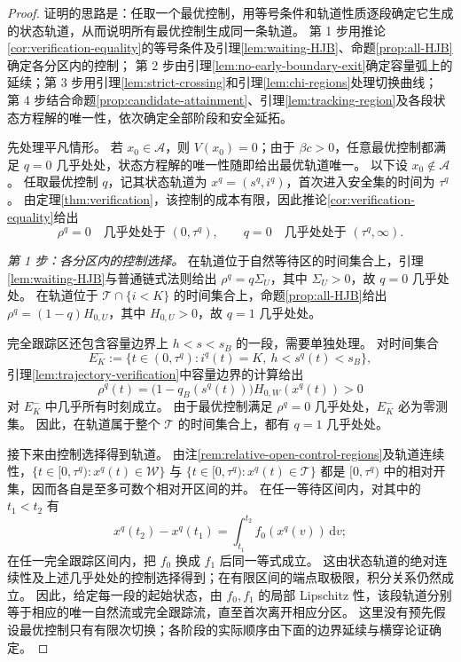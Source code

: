 \documentclass[11pt,a4paper,UTF8]{ctexart}
\theoremstyle{definition}
\newcommand{\Acal}{\mathcal A}
\newcommand{\dd}{\,\mathrm d}
\begin{document}
\begin{proof}
证明的思路是：任取一个最优控制，用等号条件和轨道性质逐段确定它生成的状态轨道，从而说明所有最优控制生成同一条轨道。
第 1 步用推论\ref{cor:verification-equality}的等号条件及引理\ref{lem:waiting-HJB}、命题\ref{prop:all-HJB}确定各分区内的控制；
第 2 步由引理\ref{lem:no-early-boundary-exit}确定容量弧上的延续；第 3 步用引理\ref{lem:strict-crossing}和引理\ref{lem:chi-regions}处理切换曲线；
第 4 步结合命题\ref{prop:candidate-attainment}、引理\ref{lem:tracking-region}及各段状态方程解的唯一性，依次确定全部阶段和安全延拓。

先处理平凡情形。
若 $x_0\in\Acal$，则 $V(x_0)=0$；由于 $\beta c>0$，任意最优控制都满足 $q=0$ 几乎处处，状态方程解的唯一性随即给出最优轨道唯一。
以下设 $x_0\notin\Acal$。
任取最优控制 $q$，记其状态轨道为 $x^q=(s^q,i^q)$，首次进入安全集的时间为 $\tau^q$。
由定理\ref{thm:verification}，该控制的成本有限，因此推论\ref{cor:verification-equality}给出
\[
\rho^q=0\quad\text{几乎处处于 }(0,\tau^q),\qquad
q=0\quad\text{几乎处处于 }(\tau^q,\infty).
\]

\emph{第 1 步：各分区内的控制选择。}
在轨道位于自然等待区的时间集合上，引理\ref{lem:waiting-HJB}与普通链式法则给出 $\rho^q=q\Sigma_U$，其中 $\Sigma_U>0$，故 $q=0$ 几乎处处。
在轨道位于 $\mathcal T\cap\{i<K\}$ 的时间集合上，命题\ref{prop:all-HJB}给出 $\rho^q=(1-q)H_{0,U}$，其中 $H_{0,U}>0$，故 $q=1$ 几乎处处。

完全跟踪区还包含容量边界上 $h<s<s_B$ 的一段，需要单独处理。
对时间集合
\[
E_K^-:=\{t\in(0,\tau^q):i^q(t)=K,\ h<s^q(t)<s_B\},
\]
引理\ref{lem:trajectory-verification}中容量边界的计算给出
\[
\rho^q(t)
=\bigl(1-q_B(s^q(t))\bigr)H_{0,W}(x^q(t))>0
\]
对 $E_K^-$ 中几乎所有时刻成立。
由于最优控制满足 $\rho^q=0$ 几乎处处，$E_K^-$ 必为零测集。
因此，在轨道属于整个 $\mathcal T$ 的时间集合上，都有 $q=1$ 几乎处处。

接下来由控制选择得到轨道。
由注\ref{rem:relative-open-control-regions}及轨道连续性，$\{t\in[0,\tau^q):x^q(t)\in\mathcal W\}$ 与 $\{t\in[0,\tau^q):x^q(t)\in\mathcal T\}$ 都是 $[0,\tau^q)$ 中的相对开集，因而各自是至多可数个相对开区间的并。
在任一等待区间内，对其中的 $t_1<t_2$ 有
\[
x^q(t_2)-x^q(t_1)=\int_{t_1}^{t_2}f_0(x^q(v))\dd v;
\]
在任一完全跟踪区间内，把 $f_0$ 换成 $f_1$ 后同一等式成立。
这由状态轨道的绝对连续性及上述几乎处处的控制选择得到；在有限区间的端点取极限，积分关系仍然成立。
因此，给定每一段的起始状态，由 $f_0,f_1$ 的局部 Lipschitz 性，该段轨道分别等于相应的唯一自然流或完全跟踪流，直至首次离开相应分区。
这里没有预先假设最优控制只有有限次切换；各阶段的实际顺序由下面的边界延续与横穿论证确定。


\end{proof}
\end{document}
